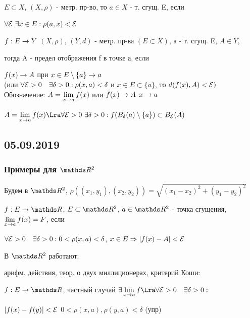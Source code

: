 \documentclass[12pt, fleqn]{article}
\begin{document}
\begin{definition}
    $E \subset X$, $(X, \rho)$ - метр. пр-во, то $a \in X$ - т. сгущ. E, если

    $\forall \mathcal{E} \ \exists x \in E: \rho(a,x) < \mathcal{E}$
\end{definition}

\begin{definition}
    $f:E \rightarrow Y$ $(X, \rho)$, $(Y,d)$ - метр. пр-ва $(E \subset X)$, а - т. сгущ. E, $A \in Y$,

    тогда A - предел отображения f в точке а, если

    $f(x) \rightarrow A$ при $x \in E \setminus \{a\}\rightarrow a$\\
    (или $\forall \mathcal{E}>0 \quad \exists \delta>0: \rho(x,a)<\delta$ и $x \in E \subset \{a\}$, то $d(f(x),A) < \mathcal{E})$\\
    Обозначение: $A=\lim\limits_{x \rightarrow a} f(x)$ или $f(x) \rightarrow A$ $x \rightarrow a$
\end{definition}

\begin{remark}
    $A=\lim\limits_{x \ra a} f(x) \Lra \forall \E > 0 \ \e \delta>0: f(B_\delta(a) \setminus \{a\}) \subset B_\E (A)$
\end{remark}

\newpage
\subsection{05.09.2019}
\subsubsection{Примеры для $\R^2$}

Будем в $\R^2$, $\rho((x_1,y_1), (x_2,y_2)) = \sqrt{(x_1-x_2)^2 + (y_1-y_2)^2}$
\begin{definition}
    $f: E \ra \R$, $E \subset \R^2$, $a \in \R^2$ - точка сгущения, $\lim\limits_{x \rightarrow a} f(x) = F$, если

    $\forall \mathcal{E}>0 \quad \exists \delta>0: 0<\rho(x,a)<\delta$, $x \in E \Rightarrow |f(x)-A|<\mathcal{E}$
\end{definition}
В $\R^2$ работают:

арифм. действия, теор. о двух миллиционерах, критерий Коши:
\begin{definition}
    $f: E \ra \R$, частный случай $\e \lim\limits_{x \ra a} f \Lra \forall \E>0 \q \e \delta > 0:$

    $|f(x)-f(y)|<\mathcal{E}$ $0<\rho(x,a), \rho(y,a)<\delta$ (упр)
\end{definition}
\end{document}
